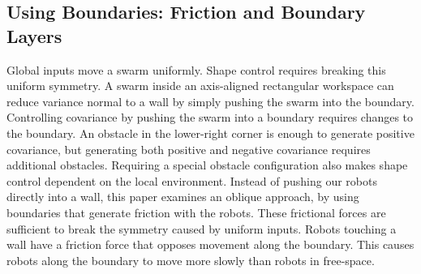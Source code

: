 %


\subsection{Using Boundaries: Friction and Boundary Layers}\label{subsec:WallFriction}
Global inputs move a swarm uniformly.  
Shape control requires breaking this uniform symmetry.  
A swarm inside an axis-aligned rectangular workspace can reduce variance normal to a wall by simply pushing the swarm into the boundary. 
Controlling covariance by pushing the swarm into a boundary requires changes to the boundary.  
An obstacle in the lower-right corner is enough to generate positive covariance, but generating both positive and negative covariance requires additional obstacles.  
Requiring a special obstacle configuration also makes shape control dependent on the local environment. 
Instead of pushing our robots directly into a wall, this paper examines an oblique approach, by using boundaries that generate friction with the robots.  These frictional forces are  sufficient to break the symmetry caused by uniform inputs.  Robots touching a wall have a friction force that opposes movement along the boundary.  
This causes robots along the boundary to move more slowly than robots in free-space. 
  
